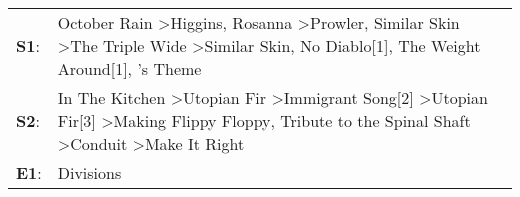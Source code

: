 \begin{supertabular}{p{0.03\textwidth}p{0.92\textwidth}}
 \textbf{S1}:  &  October Rain\textsuperscript{} \textgreater \enspace Higgins\textsuperscript{}, \enspace Rosanna\textsuperscript{} \textgreater \enspace Prowler\textsuperscript{}, \enspace Similar Skin\textsuperscript{} \textgreater \enspace The Triple Wide\textsuperscript{} \textgreater \enspace Similar Skin\textsuperscript{}, \enspace No Diablo[1]\textsuperscript{}, \enspace The Weight Around[1]\textsuperscript{}, 's Theme\textsuperscript{}  \enspace  \\
 \textbf{S2}:  &                           In The Kitchen\textsuperscript{} \textgreater \enspace Utopian Fir\textsuperscript{} \textgreater \enspace Immigrant Song[2]\textsuperscript{} \textgreater \enspace Utopian Fir[3]\textsuperscript{} \textgreater \enspace Making Flippy Floppy\textsuperscript{}, \enspace Tribute to the Spinal Shaft\textsuperscript{} \textgreater \enspace Conduit\textsuperscript{} \textgreater \enspace Make It Right\textsuperscript{}  \enspace  \\
 \textbf{E1}:  &                                                                                                                                                                                                                                                                                                                                                                                                                                Divisions\textsuperscript{}  \enspace  \\
\end{supertabular}
